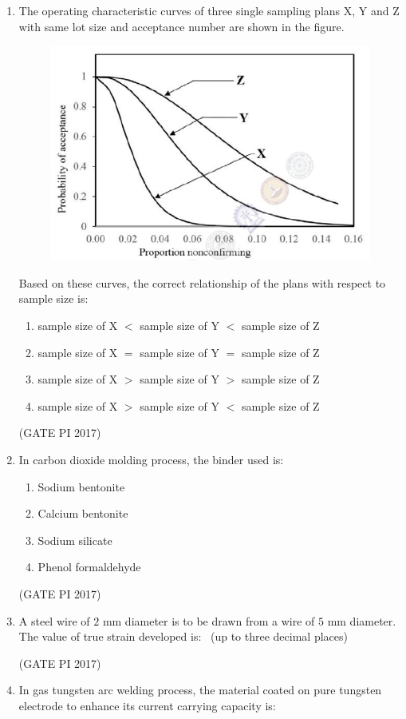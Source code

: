 \documentclass[journal,12pt,onecolumn]{IEEEtran}
\theoremstyle{remark}
\begin{document}
\begin{enumerate}
\item The operating characteristic curves of three single sampling plans X, Y and Z with same lot size and acceptance number are shown in the figure.

\begin{figure}[h]
    \centering
    \includegraphics[width=0.5\linewidth]{figs/fig1.png}
    \caption{}
    \label{fig:placeholder}
\end{figure} 


Based on these curves, the correct relationship of the plans with respect to sample size is:
\begin{enumerate}
\item sample size of X $<$ sample size of Y $<$ sample size of Z
\item sample size of X $=$ sample size of Y $=$ sample size of Z
\item sample size of X $>$ sample size of Y $>$ sample size of Z
\item sample size of X $>$ sample size of Y $<$ sample size of Z
\end{enumerate}
\hfill (GATE PI 2017)

\item In carbon dioxide molding process, the binder used is:
\begin{enumerate}
\item Sodium bentonite
\item Calcium bentonite
\item Sodium silicate
\item Phenol formaldehyde
\end{enumerate}

\hfill (GATE PI 2017)

\item A steel wire of $2$ mm diameter is to be drawn from a wire of $5$ mm diameter.  
The value of true strain developed is:  
\underline{\hspace{3cm}} \ (up to three decimal places)  

\hfill (GATE PI 2017)

\item In gas tungsten arc welding process, the material coated on pure tungsten electrode  
to enhance its current carrying capacity is:
\begin{enumerate}
\end{enumerate}


\end{enumerate}
\end{document}
